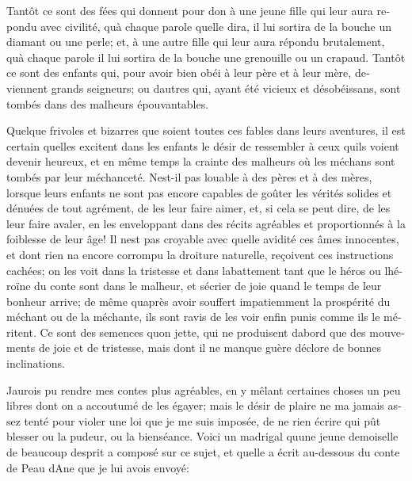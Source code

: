 \documentclass[14pt,a4paper]{memoir}
\begin{document}
\begin{otherlanguage}{french}
Tantôt ce sont des fées qui donnent pour don à une jeune fille qui leur
aura repondu avec civilité, qu\textquotesingle à chaque parole
qu\textquotesingle elle dira, il lui sortira de la bouche un diamant ou
une perle; et, à une autre fille qui leur aura répondu brutalement,
qu\textquotesingle à chaque parole il lui sortira de la bouche une
grenouille ou un crapaud. Tantôt ce sont des enfants qui, pour avoir
bien obéi à leur père et à leur mère, deviennent grands seigneurs; ou
d\textquotesingle autres qui, ayant été vicieux et désobéissans, sont
tombés dans des malheurs épouvantables.

Quelque frivoles et bizarres que soient toutes ces fables dans leurs
aventures, il est certain qu\textquotesingle elles excitent dans les
enfants le désir de ressembler à ceux qu\textquotesingle ils voient
devenir heureux, et en même temps la crainte des malheurs où les méchans
sont tombés par leur méchanceté. N\textquotesingle est-il pas louable à
des pères et à des mères, lorsque leurs enfants ne sont pas encore
capables de goûter les vérités solides et dénuées de tout agrément, de
les leur faire aimer, et, si cela se peut dire, de les leur faire
avaler, en les enveloppant dans des récits agréables et proportionnés à
la foiblesse de leur âge! Il n\textquotesingle est pas croyable avec
quelle avidité ces âmes innocentes, et dont rien n\textquotesingle a
encore corrompu la droiture naturelle, reçoivent ces instructions
cachées; on les voit dans la tristesse et dans
l\textquotesingle abattement tant que le héros ou
l\textquotesingle héroïne du conte sont dans le malheur, et
s\textquotesingle écrier de joie quand le temps de leur bonheur arrive;
de même qu\textquotesingle après avoir souffert impatiemment la
prospérité du méchant ou de la méchante, ils sont ravis de les voir
enfin punis comme ils le méritent. Ce sont des semences
qu\textquotesingle on jette, qui ne produisent d\textquotesingle abord
que des mouvements de joie et de tristesse, mais dont il ne manque guère
d\textquotesingle éclore de bonnes inclinations.

J\textquotesingle aurois pu rendre mes contes plus agréables, en y
mêlant certaines choses un peu libres dont on a accoutumé de les égayer;
mais le désir de plaire ne m\textquotesingle a jamais assez tenté pour
violer une loi que je me suis imposée, de ne rien écrire qui pût blesser
ou la pudeur, ou la bienséance. Voici un madrigal qu\textquotesingle une
jeune demoiselle de beaucoup d\textquotesingle esprit a composé sur ce
sujet, et qu\textquotesingle elle a écrit au-dessous du conte de Peau
d\textquotesingle Ane que je lui avois envoyé:


\end{otherlanguage}
\end{document}
